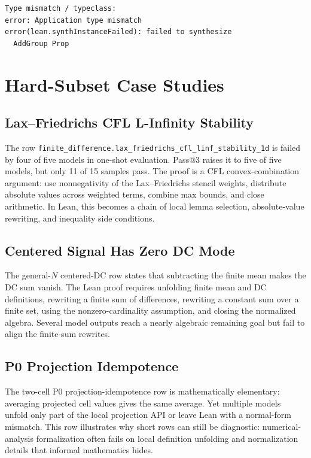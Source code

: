 \begin{verbatim}
Type mismatch / typeclass:
error: Application type mismatch
error(lean.synthInstanceFailed): failed to synthesize
  AddGroup Prop
\end{verbatim}

\section{Hard-Subset Case Studies}

\subsection{Lax--Friedrichs CFL L-Infinity Stability}

The row \texttt{finite\_difference.lax\_friedrichs\_cfl\_linf\_stability\_1d}
is failed by four of five models in one-shot evaluation. Pass@3 raises it to
five of five models, but only 11 of 15 samples pass. The proof is a CFL
convex-combination argument: use nonnegativity of the Lax--Friedrichs stencil
weights, distribute absolute values across weighted terms, combine max bounds,
and close arithmetic. In Lean, this becomes a chain of local lemma selection,
absolute-value rewriting, and inequality side conditions.

\subsection{Centered Signal Has Zero DC Mode}

The general-\(N\) centered-DC row states that subtracting the finite mean makes
the DC sum vanish. The Lean proof requires unfolding finite mean and DC
definitions, rewriting a finite sum of differences, rewriting a constant sum
over a finite set, using the nonzero-cardinality assumption, and closing the
normalized algebra. Several model outputs reach a nearly algebraic remaining
goal but fail to align the finite-sum rewrites.

\subsection{P0 Projection Idempotence}

The two-cell P0 projection-idempotence row is mathematically elementary:
averaging projected cell values gives the same average. Yet multiple models
unfold only part of the local projection API or leave Lean with a normal-form
mismatch. This row illustrates why short rows can still be diagnostic:
numerical-analysis formalization often fails on local definition unfolding and
normalization details that informal mathematics hides.

